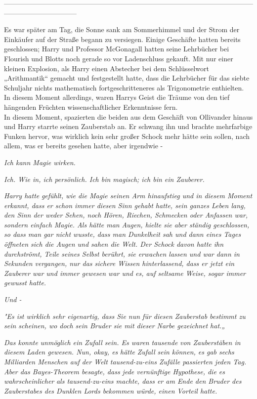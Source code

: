 {--------------------------------------------------------------------------------------------------------------------------------------------

\hfill\break Es war später am Tag, die Sonne sank am Sommerhimmel und der Strom der Einkäufer auf der Straße begann zu versiegen. Einige Geschäfte hatten bereits geschlossen; Harry und Professor McGonagall hatten seine Lehrbücher bei Flourish und Blotts noch gerade so vor Ladenschluss gekauft. Mit nur einer kleinen Explosion, als Harry einen Abstecher bei dem Schlüsselwort „Arithmantik“ gemacht und festgestellt hatte, dass die Lehrbücher für das siebte Schuljahr nichts mathematisch fortgeschritteneres als Trigonometrie enthielten.\\ In diesem Moment allerdings, waren Harrys Geist die Träume von den tief hängenden Früchten wissenschaftlicher Erkenntnisse fern.\\ In diesem Moment, spazierten die beiden aus dem Geschäft von Ollivander hinaus und Harry starrte seinen Zauberstab an. Er schwang ihn und brachte mehrfarbige Funken hervor, was wirklich kein sehr großer Schock mehr hätte sein sollen, nach allem, was er bereits gesehen hatte, aber irgendwie -

\emph{Ich kann Magie wirken.}

\emph{Ich. Wie in, ich persönlich. Ich bin magisch; ich bin ein Zauberer.}

\emph{Harry hatte} \emph{\emph{gefühlt,}} \emph{wie die Magie seinen Arm hinaufstieg und in diesem Moment erkannt, dass er schon immer diesen Sinn gehabt hatte, sein ganzes Leben lang, den Sinn der weder Sehen, noch Hören, Riechen, Schmecken oder Anfassen war, sondern einfach Magie. Als hätte man} \emph{Augen, hielte sie aber ständig geschlossen, so dass man gar nicht wusste, dass man Dunkelheit sah und dann eines Tages öffneten sich die Augen und sahen die Welt. Der Schock davon hatte ihn durchströmt, Teile seines Selbst berührt, sie erwachen lassen und war dann in Sekunden vergangen, nur das sichere Wissen hinterlassend, dass er jetzt ein Zauberer war und immer gewesen war und es, auf seltsame Weise, sogar immer gewusst hatte.}

\emph{Und -}

\emph{\emph{"Es ist wirklich sehr eigenartig, dass Sie nun für diesen Zauberstab bestimmt zu sein scheinen, wo doch sein Bruder sie mit dieser Narbe gezeichnet hat.„}}

\emph{Das konnte} \emph{\emph{unmöglich}} \emph{ein Zufall sein. Es waren} \emph{\emph{tausende}} \emph{von Zauberstäben in diesem Laden gewesen. Nun, okay, es} \emph{\emph{hätte}} \emph{Zufall sein können, es gab sechs Milliarden Menschen auf der Welt tausend-zu-eins Zufälle passierten jeden Tag. Aber das Bayes-Theorem besagte, dass jede vernünftige Hypothese, die es} \emph{\emph{wahrscheinlicher}} \emph{als tausend-zu-eins machte, dass er am Ende den Bruder des Zauberstabes des Dunklen Lords bekommen würde, einen Vorteil hatte.}

}
